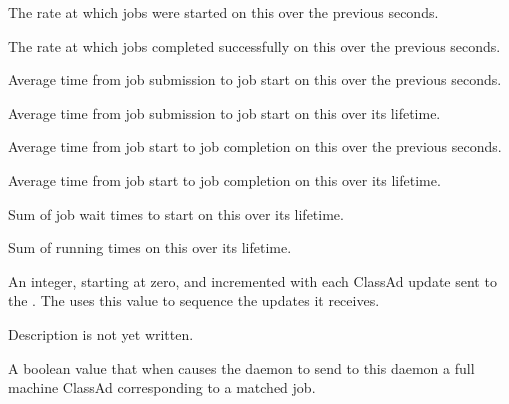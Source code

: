 \begin{description}
\item[\AdAttr{JobStartRate}:] The rate at which jobs were started
  on this  over the previous 
   seconds.

\item[\AdAttr{JobCompletionRate}:] The rate at which jobs completed
  successfully on this  over the previous 
   seconds.

\item[\AdAttr{MeanTimeToStart}:] Average time from job submission
  to job start on this  over the previous 
   seconds.

\item[\AdAttr{MeanTimeToStartCumulative}:] Average time from job submission
  to job start on this  over its lifetime.

\item[\AdAttr{MeanRunningTime}:] Average time from job start to
  job completion on this  over the previous 
   seconds.

\item[\AdAttr{MeanRunningTimeCumulative}:] Average time from job start to
  job completion on this  over its lifetime.

\item[\AdAttr{SumTimeToStartCumulative}:] Sum of job wait times
  to start on this  over its lifetime.

\item[\AdAttr{SumRunningTimeCumulative}:] Sum of running times
  on this  over its lifetime.

\item[\AdAttr{UpdateSequenceNumber}:] An integer, starting at zero,
  and incremented with each ClassAd update sent to the .
  The  uses this value to sequence the updates it
  receives.

\item[\AdAttr{VirtualMemory}:] Description is not yet written.

\item[\AdAttr{WantResAd}:] A boolean value that when 
  causes the  daemon to send to this 
  daemon a full machine ClassAd corresponding to a matched job.

\end{description}


